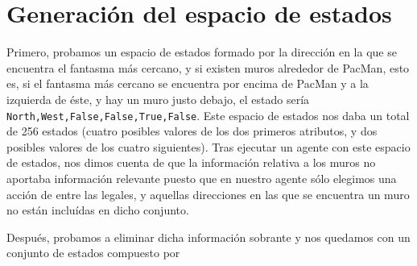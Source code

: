 \documentclass[12pt]{article}
\begin{document}
\section{Generación del espacio de estados}

%


Primero, probamos un espacio de estados formado por la dirección en la que se encuentra el fantasma más cercano, y si existen muros alrededor de PacMan, esto es, si el fantasma más cercano se encuentra por encima de PacMan y a la izquierda de éste, y hay un muro justo debajo, el estado sería \texttt{North,West,False,False,True,False}. Este espacio de estados nos daba un total de 256 estados (cuatro posibles valores de los dos primeros atributos, y dos posibles valores de los cuatro siguientes).
Tras ejecutar un agente con este espacio de estados, nos dimos cuenta de que la información relativa a los muros no aportaba información relevante puesto que en nuestro agente sólo elegimos una acción de entre las legales, y aquellas direcciones en las que se encuentra un muro no están incluídas en dicho conjunto.

Después, probamos a eliminar dicha información sobrante y nos quedamos con un conjunto de estados compuesto por
\end{document}

